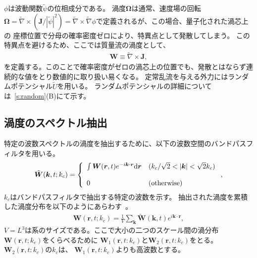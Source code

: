 \documentclass[12pt,a4paper]{jbook}
\begin{document}
		$\phi$は波動関数$\tilde{\psi}$の位相成分である。
		渦度$\bm{\Omega}$は通常、速度場の回転
		$\bm{\Omega} 
		= \tilde{\nabla} \times (\bm{J} / |\tilde{\psi}|^2) 
		= \tilde{\nabla} \times \tilde{\nabla} \phi$で定義されるが、この場合、量子化された渦芯上の
		座標位置で分母の確率密度ゼロにより、特異点として発散してしまう。
		この特異点を避けるため、ここでは質量流の渦度として、
		\begin{eqnarray}
			\label{eq:VORTICITY}
			{\bm W} \equiv \tilde{\nabla} \times {\bm J},
		\end{eqnarray}
		を定義する。このことで確率密度がゼロの渦芯上の位置でも、発散とはならず連続的な値をとり数値的に取り扱い易くなる。
        定常乱流を与える外力にはランダムポテンシャル$\tilde{U}$を用いる。
        ランダムポテンシャルの詳細については~\ref{s:random}(B)にて示す。


        \subsection{渦度のスペクトル抽出}
		特定の波数スペクトルの渦度を抽出するために、以下の波数空間のバンドパスフィルタを用いる。
		\begin{eqnarray}
			\label{eq:FFT}
			\tilde{{\bm W}}(\bm{k}, t; k_c) = \left\{
				\begin{array}{ll}
					\int {\bm W}({\bm r}, t) e^{-i \bm{k} \cdot {\bm r}}  {\rm d}\bm{r}
					& (k_c/\sqrt{2}< |\bm{k}| <\sqrt{2}k_c)
					\\
					\\
					0 & ({\rm otherwise})
				\end{array}
			\right.,
		\end{eqnarray}
		$k_c$はバンドパスフィルタで抽出する特定の波数を示す。
		抽出された渦度を累積した渦度分布を以下のようにあらわす~\cite{Goto2,Goto3}。
		\begin{eqnarray}
			\label{eq:IFFT}
			{\bm W}(\bm{r}, t; k_c) =
			\frac{1}{V} \sum_{\bm{k}} \tilde{\bm{W}}(\bm{k}, t) e^{i \bm{k} \cdot \bm{r}},
		\end{eqnarray}
		$V=L^3$は系のサイズである。ここで大小の二つのスケール間の渦分布$\bm{W}(\bm{r}, t; k_c)$をくらべるために
		$\bm{W}_1(\bm{r},t:k_c)$と$\bm{W}_2(\bm{r},t:k_c)$をとる。$\bm{W}_2(\bm{r},t:k_c)$の$k_c$は、
        $\bm{W}_1(\bm{r},t:k_c)$よりも高波数とする。
\end{document}
